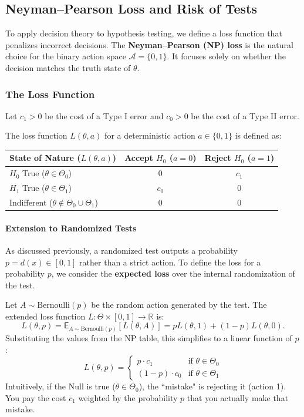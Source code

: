 \subsection{Neyman--Pearson Loss and Risk of Tests}

To apply decision theory to hypothesis testing, we define a loss function that penalizes incorrect decisions. The \textbf{Neyman--Pearson (NP) loss} is the natural choice for the binary action space $\mathcal{A} = \{0, 1\}$. It focuses solely on whether the decision matches the truth state of $\theta$.

\subsubsection{The Loss Function}

Let $c_1 > 0$ be the cost of a Type I error and $c_0 > 0$ be the cost of a Type II error.

\begin{definition}
The loss function $L(\theta, a)$ for a deterministic action $a \in \{0, 1\}$ is defined as:

\begin{center}
\begin{tabular}{l|c|c}
\toprule
\textbf{State of Nature (\(L(\theta,a)\))} & \textbf{Accept $H_0$ ($a=0$)} & \textbf{Reject $H_0$ ($a=1$)} \\
\midrule
$H_0$ True ($\theta \in \Theta_0$) & 0 & $c_1$ \\
$H_1$ True ($\theta \in \Theta_1$) & $c_0$ & 0 \\
Indifferent ($\theta \notin \Theta_0 \cup \Theta_1$) & 0 & 0 \\
\bottomrule
\end{tabular}
\end{center}
\end{definition}

\paragraph{Extension to Randomized Tests}
As discussed previously, a randomized test outputs a probability $p = d(x) \in [0,1]$ rather than a strict action. To define the loss for a probability $p$, we consider the \textbf{expected loss} over the internal randomization of the test.

Let $A \sim \text{Bernoulli}(p)$ be the random action generated by the test. The extended loss function $L: \Theta \times [0,1] \to \mathbb{R}$ is:
\[
L(\theta, p) = \mathsf{E}_{A \sim \text{Bernoulli}(p)}[L(\theta, A)] = p L(\theta, 1) + (1 - p) L(\theta, 0).
\]
Substituting the values from the NP table, this simplifies to a linear function of $p$:
\[
L(\theta, p) = 
\begin{cases} 
p \cdot c_1 & \text{if } \theta \in \Theta_0 \\
(1 - p) \cdot c_0 & \text{if } \theta \in \Theta_1
\end{cases}
\]
Intuitively, if the Null is true ($\theta \in \Theta_0$), the ``mistake" is rejecting it (action 1). You pay the cost $c_1$ weighted by the probability $p$ that you actually make that mistake.

